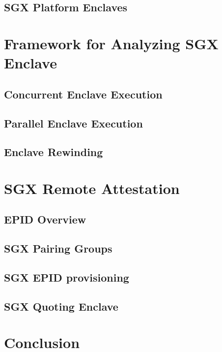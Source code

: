 \documentclass[11pt]{article}
\begin{document}
  \subsection{SGX Platform Enclaves}

  \section{Framework for Analyzing SGX Enclave}
  \subsection{Concurrent Enclave Execution}
  \subsection{Parallel Enclave Execution}
  \subsection{Enclave Rewinding}

  \section{SGX Remote Attestation}
  \subsection{EPID Overview}
  \subsection{SGX Pairing Groups}
  \subsection{SGX EPID provisioning}
  \subsection{SGX Quoting Enclave}

  \section{Conclusion}



\end{document}
